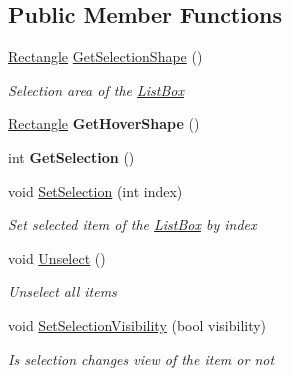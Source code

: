 \subsection*{Public Member Functions}
\begin{DoxyCompactItemize}
\item 
\mbox{\hyperlink{class_space_v_i_l_1_1_rectangle}{Rectangle}} \mbox{\hyperlink{class_space_v_i_l_1_1_list_box_a27bec173b7b8fccd930afe3e6f3d63c2}{Get\+Selection\+Shape}} ()
\begin{DoxyCompactList}\small\item\em Selection area of the \mbox{\hyperlink{class_space_v_i_l_1_1_list_box}{List\+Box}} \end{DoxyCompactList}\item 
\mbox{\label{class_space_v_i_l_1_1_list_box_ad7a324005cf9d1d88acc32123910dabe}} 
\mbox{\hyperlink{class_space_v_i_l_1_1_rectangle}{Rectangle}} {\bfseries Get\+Hover\+Shape} ()
\item 
\mbox{\label{class_space_v_i_l_1_1_list_box_a98c7e5ac7657e77e49c2fd0d54b7ddcb}} 
int {\bfseries Get\+Selection} ()
\item 
void \mbox{\hyperlink{class_space_v_i_l_1_1_list_box_a8a669fef109cdf5987cdb97af858d3fb}{Set\+Selection}} (int index)
\begin{DoxyCompactList}\small\item\em Set selected item of the \mbox{\hyperlink{class_space_v_i_l_1_1_list_box}{List\+Box}} by index \end{DoxyCompactList}\item 
void \mbox{\hyperlink{class_space_v_i_l_1_1_list_box_abc68331993bf0f0c54775f309edfc83b}{Unselect}} ()
\begin{DoxyCompactList}\small\item\em Unselect all items \end{DoxyCompactList}\item 
void \mbox{\hyperlink{class_space_v_i_l_1_1_list_box_af01fa2d7d867b5da7847844f64405cad}{Set\+Selection\+Visibility}} (bool visibility)
\begin{DoxyCompactList}\small\item\em Is selection changes view of the item or not \end{DoxyCompactList}\item 
\mbox{\label{class_space_v_i_l_1_1_list_box_aa7822a48e4eccb17e81f28c565e9b73c}} 

\end{DoxyCompactItemize}
